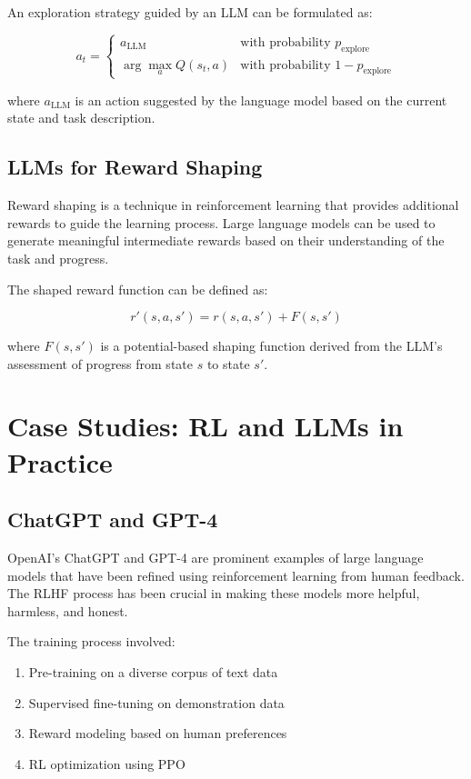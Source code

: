 \documentclass{article}
\begin{document}
An exploration strategy guided by an LLM can be formulated as:

\begin{equation}
a_t = \begin{cases}
a_{\text{LLM}} & \text{with probability } p_{\text{explore}} \\
\arg\max_a Q(s_t, a) & \text{with probability } 1 - p_{\text{explore}}
\end{cases}
\end{equation}

where $a_{\text{LLM}}$ is an action suggested by the language model based on the current state and task description.

\subsection{LLMs for Reward Shaping}

Reward shaping is a technique in reinforcement learning that provides additional rewards to guide the learning process. Large language models can be used to generate meaningful intermediate rewards based on their understanding of the task and progress.

The shaped reward function can be defined as:

\begin{equation}
r'(s, a, s') = r(s, a, s') + F(s, s')
\end{equation}

where $F(s, s')$ is a potential-based shaping function derived from the LLM's assessment of progress from state $s$ to state $s'$.

\section{Case Studies: RL and LLMs in Practice}

\subsection{ChatGPT and GPT-4}

OpenAI's ChatGPT and GPT-4 are prominent examples of large language models that have been refined using reinforcement learning from human feedback. The RLHF process has been crucial in making these models more helpful, harmless, and honest.

The training process involved:
\begin{enumerate}
    \item Pre-training on a diverse corpus of text data
    \item Supervised fine-tuning on demonstration data
    \item Reward modeling based on human preferences
    \item RL optimization using PPO
\end{enumerate}
\end{document}
